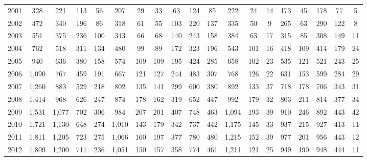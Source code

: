 \begin{table}[htbp]
\begin{tabular}{l*{18}{c}}
2001      &      328&      221&      113&       56&      207&       29&       33&       63&      124&       85&      222&       24&       14&      173&       45&      178&       77&        5\\
2002      &      472&      340&      196&       86&      318&       61&       55&      103&      220&      137&      335&       50&        9&      265&       63&      290&      122&        8\\
2003      &      551&      375&      236&      100&      343&       66&       68&      140&      243&      158&      384&       63&       17&      315&       85&      308&      149&       11\\
2004      &      762&      518&      311&      134&      480&       99&       89&      172&      323&      196&      543&      101&       16&      418&      109&      414&      179&       24\\
2005      &      940&      636&      380&      158&      574&      109&      109&      195&      424&      285&      658&      102&       23&      535&      121&      521&      243&       25\\
2006      &    1,090&      767&      459&      191&      667&      121&      127&      244&      483&      307&      768&      126&       22&      631&      153&      599&      284&       29\\
2007      &    1,260&      883&      529&      218&      802&      135&      141&      299&      600&      380&      892&      133&       37&      718&      178&      706&      343&       31\\
2008      &    1,414&      968&      626&      247&      874&      178&      162&      319&      652&      447&      992&      179&       32&      803&      211&      814&      377&       34\\
2009      &    1,531&    1,077&      702&      306&      984&      207&      201&      407&      748&      463&    1,094&      193&       39&      910&      246&      892&      443&       42\\
2010      &    1,721&    1,130&      648&      274&    1,010&      143&      179&      342&      737&      442&    1,175&      145&       33&      937&      215&      927&      413&       11\\
2011      &    1,811&    1,205&      723&      275&    1,066&      160&      197&      377&      780&      480&    1,215&      152&       39&      977&      201&      956&      443&       12\\
2012      &    1,809&    1,200&      711&      236&    1,051&      150&      157&      358&      774&      461&    1,211&      121&       25&      949&      190&      948&      444&       11\\

\end{tabular}
\end{table}
